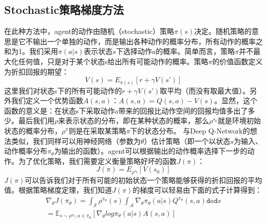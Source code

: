 \subsection{Stochastic策略梯度方法}
\label{sec:stochas_PG}
在此种方法中，agent的动作由随机（stochastic）策略$\pi (s)$决定。随机策略的意思是它不输出一个单独的动作，而是输出各种动作的概率分布，所有动作的概率之和为1。我们采用$\pi (a|s)$表示状态$s$下选择动作$a$的概率。简单而言，策略$\pi$并不最大化任何值，只是对于某个状态s给出所有可能动作的概率。策略$\pi$的价值函数定义为折扣回报的期望：
\begin{equation}
V(s) = E_{\pi (s)}[r + \gamma V(s’)]
\end{equation}
这里我们对状态s下的所有可能动作的$r + \gamma V(s’)$取平均（而没有取最大值）。另外我们定义一个优势函数$A(s, a)$：$A(s,a) = Q(s,a) - V(s) $。显然，这个函数的意义是：在状态s下采取动作a带来的回报比动作空间的回报均值多出了多少。最后我们用$\rho$来表示状态的分布，即在某种状态的概率，那么$\rho^{s_0}$就是环境初始状态的概率分布，$\rho^\pi$则是在采取某策略$\pi$下的状态分布。
与Deep Q-Network的想法类似，我们同样可以用神经网络（参数为$\theta$）估计策略（即一个以状态$s$为输入、动作概率分布$\pi_\theta$为输出的函数）。agent可以根据输出的动作概率选择下一步的动作。为了优化策略，我们需要定义衡量策略好坏的函数$J(\pi)$：
\begin{equation}
J(\pi) = E_{\rho^{s_0}}[V(s_0)]
\end{equation}
$J(\pi)$可以告诉我们对于所有可能的初始状态一个策略能够获得的折扣回报的平均值。根据策略梯度定理\cite{sutton1999policy}，我们知道$J(\pi)$的梯度可以轻易由下面的式子计算得到：
\begin{equation}
\begin{split}
\nabla_\theta J(\pi_\theta) = \int_\mathcal{S}\rho^{\pi_\theta}(s)\int_\mathcal{A}\nabla_\theta \pi_\theta(a\vert s)Q^{\pi_\theta}(s,a) \texttt{d}a\texttt{d}s \\  = \mathbb{E}_{s\sim \rho^{\pi_\theta},a\in \pi_\theta}[\nabla_\theta log \pi_\theta(a\vert s)A(s,a)]
\end{split}
\label{stotheorem}
\end{equation}
